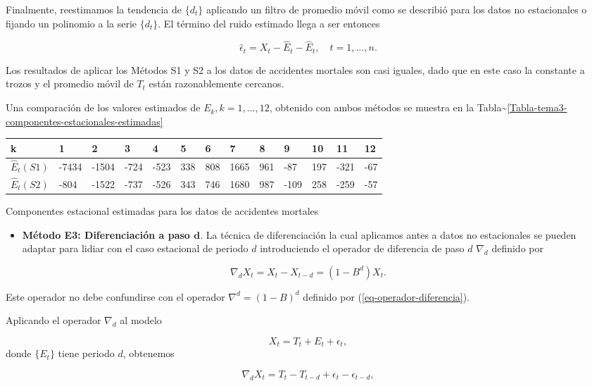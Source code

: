 \documentclass[12pt,]{krantz}
\providecommand{\tightlist}{%
  \setlength{\itemsep}{0pt}\setlength{\parskip}{0pt}}
\theoremstyle{definition}
\theoremstyle{definition}
\theoremstyle{definition}
\theoremstyle{remark}
\begin{document}
Finalmente, reestimamos la tendencia de \(\{d_t\}\) aplicando un filtro
de promedio móvil como se describió para los datos no estacionales o
fijando un polinomio a la serie \(\{d_t\}\). El término del ruido
estimado llega a ser entonces

\[\hat{\epsilon}_t = X_t - \hat{E}_t - \hat{E}_t, \quad t=1,\ldots,n.\]

Los resultados de aplicar los Métodos S1 y S2 a los datos de accidentes
mortales son casi iguales, dado que en este caso la constante a trozos y
el promedio móvil de \(T_t\) están razonablemente cercanos.

Una comparación de los valores estimados de \(E_k, k=1,\ldots,12\),
obtenido con ambos métodos se muestra en la
Tabla\textasciitilde{}\ref{Tabla-tema3-componentes-estacionales-estimadas}

\begin{longtable}[]{@{}lllllllllllll@{}}
\toprule
k & 1 & 2 & 3 & 4 & 5 & 6 & 7 & 8 & 9 & 10 & 11 & 12\tabularnewline
\midrule
\endhead
\(\hat{E}_t(S1)\) & -7434 & -1504 & -724 & -523 & 338 & 808 & 1665 & 961
& -87 & 197 & -321 & -67\tabularnewline
\(\hat{E}_t(S2)\) & -804 & -1522 & -737 & -526 & 343 & 746 & 1680 & 987
& -109 & 258 & -259 & -57\tabularnewline
\bottomrule
\end{longtable}

Componentes estacional estimadas para los datos de accidentes mortales

\begin{itemize}
\tightlist
\item
  \textbf{Método E3: Diferenciación a paso \(\mathbf{d}\)}. La técnica
  de diferenciación la cual aplicamos antes a datos no estacionales se
  pueden adaptar para lidiar con el caso estacional de periodo \(d\)
  introduciendo el operador de diferencia de paso \(d\) \(\nabla_d\)
  definido por
\end{itemize}

\begin{equation}
\nabla_dX_t = X_t-X_{t-d} = (1-B^d)X_t.
\label{eq:eq-operador-diferencia-paso-d}
\end{equation}

Este operador no debe confundirse con el operador \(\nabla^d = (1-B)^d\)
definido por (\ref{eq-operador-diferencia}).

Aplicando el operador \(\nabla_d\) al modelo

\[X_t = T_t + E_t + \epsilon_t,\] donde \(\{E_t\}\) tiene periodo \(d\),
obtenemos

\[\nabla_dX_t = T_t-T_{t-d} + \epsilon_t-\epsilon_{t-d},\]
\end{document}
